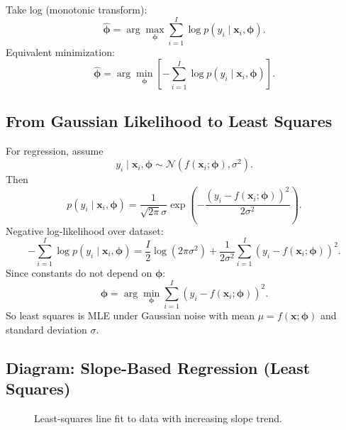 Take log (monotonic transform):
\[
\hat{\boldsymbol{\phi}}
=
\arg\max_{\boldsymbol{\phi}}
\sum_{i=1}^{I}\log p(y_i\mid \mathbf{x}_i,\boldsymbol{\phi}).
\]
Equivalent minimization:
\[
\hat{\boldsymbol{\phi}}
=
\arg\min_{\boldsymbol{\phi}}
\left[
-\sum_{i=1}^{I}\log p(y_i\mid \mathbf{x}_i,\boldsymbol{\phi})
\right].
\]

\subsection{From Gaussian Likelihood to Least Squares}
For regression, assume
\[
y_i\mid \mathbf{x}_i,\boldsymbol{\phi}
\sim
\mathcal{N}\!\left(f(\mathbf{x}_i;\boldsymbol{\phi}),\sigma^2\right).
\]
Then
\[
p(y_i\mid \mathbf{x}_i,\boldsymbol{\phi})
=
\frac{1}{\sqrt{2\pi}\sigma}
\exp\!\left(
-\frac{(y_i-f(\mathbf{x}_i;\boldsymbol{\phi}))^2}{2\sigma^2}
\right).
\]
Negative log-likelihood over dataset:
\[
-\sum_{i=1}^{I}\log p(y_i\mid \mathbf{x}_i,\boldsymbol{\phi})
=
\frac{I}{2}\log(2\pi\sigma^2)
+
\frac{1}{2\sigma^2}
\sum_{i=1}^{I}(y_i-f(\mathbf{x}_i;\boldsymbol{\phi}))^2.
\]
Since constants do not depend on $\boldsymbol{\phi}$:
\[
\hat{\boldsymbol{\phi}}
=
\arg\min_{\boldsymbol{\phi}}
\sum_{i=1}^{I}(y_i-f(\mathbf{x}_i;\boldsymbol{\phi}))^2.
\]
So least squares is MLE under Gaussian noise with mean $\mu=f(\mathbf{x};\boldsymbol{\phi})$
and standard deviation $\sigma$.

\subsection{Diagram: Slope-Based Regression (Least Squares)}
\begin{figure}[h!]
\centering
{}
\caption{Least-squares line fit to data with increasing slope trend.}
\end{figure}

